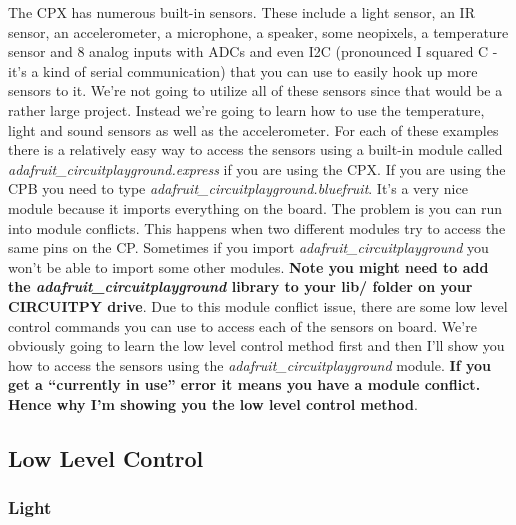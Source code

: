 The CPX has numerous built-in sensors. These include a light sensor, an IR sensor, an accelerometer, a microphone, a speaker, some neopixels, a temperature sensor and 8 analog inputs with ADCs and even I2C (pronounced I squared C - it’s a kind of serial communication) that you can use to easily hook up more sensors to it. We’re not going to utilize all of these sensors since that would be a rather large project. Instead we’re going to learn how to use the temperature, light and sound sensors as well as the accelerometer. For each of these examples there is a relatively easy way to access the sensors using a built-in module called {\it adafruit\_circuitplayground.express} if you are using the CPX. If you are using the CPB you need to type {\it adafruit\_circuitplayground.bluefruit}. It’s a very nice module because it imports everything on the board. The problem is you can run into module conflicts. This happens when two different modules try to access the same pins on the CP. Sometimes if you import {\it adafruit\_circuitplayground} you won’t be able to import some other modules. {\bf Note you might need to add the {\it adafruit\_circuitplayground} library to your lib/ folder on your CIRCUITPY drive}. Due to this module conflict issue, there are some low level control commands you can use to access each of the sensors on board. We’re obviously going to learn the low level control method first and then I’ll show you how to access the sensors using the {\it adafruit\_circuitplayground} module. {\bf If you get a “currently in use” error it means you have a module conflict. Hence why I’m showing you the low level control method}.

\subsection{Low Level Control}

\subsubsection{Light}

